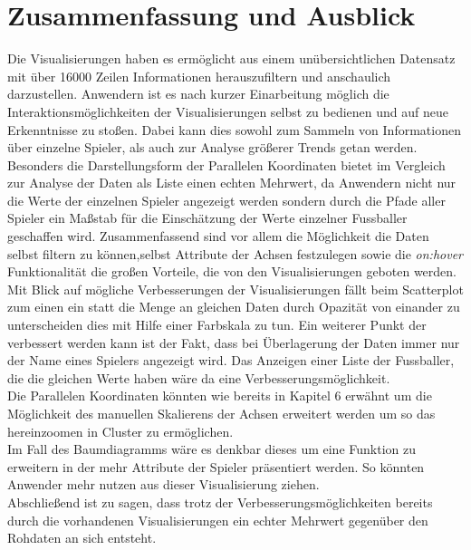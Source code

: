 \documentclass[usegeometry=true]{scrartcl}
\begin{document}
\section{Zusammenfassung und Ausblick}
Die Visualisierungen haben es ermöglicht aus einem unübersichtlichen Datensatz mit über 16000 Zeilen Informationen herauszufiltern und anschaulich darzustellen.
Anwendern ist es nach kurzer Einarbeitung möglich die Interaktionsmöglichkeiten der Visualisierungen selbst zu bedienen und auf neue Erkenntnisse zu stoßen. Dabei kann dies sowohl zum Sammeln von Informationen über einzelne Spieler, als auch zur Analyse größerer Trends getan werden. Besonders die Darstellungsform der Parallelen Koordinaten bietet im Vergleich zur Analyse der Daten als Liste einen echten Mehrwert, da Anwendern nicht nur die Werte der einzelnen Spieler angezeigt werden sondern durch die Pfade aller Spieler ein Maßstab für die Einschätzung der Werte einzelner Fussballer geschaffen wird. Zusammenfassend sind vor allem die Möglichkeit die Daten selbst filtern zu können,selbst Attribute der Achsen festzulegen sowie die \textit{on:hover} Funktionalität die großen Vorteile, die von den Visualisierungen geboten werden.\\
Mit Blick auf mögliche Verbesserungen der Visualisierungen fällt beim Scatterplot zum einen ein statt die Menge an gleichen Daten durch Opazität von einander zu unterscheiden dies mit Hilfe einer Farbskala zu tun. Ein weiterer Punkt der verbessert werden kann ist der Fakt, dass bei Überlagerung der Daten immer nur der Name eines Spielers angezeigt wird. Das Anzeigen einer Liste der Fussballer, die die gleichen Werte haben wäre da eine Verbesserungsmöglichkeit.\\
Die Parallelen Koordinaten könnten wie bereits in Kapitel 6 erwähnt um die Möglichkeit des manuellen Skalierens der Achsen erweitert werden um so das hereinzoomen in Cluster zu ermöglichen.\\
Im Fall des Baumdiagramms wäre es denkbar dieses um eine Funktion zu erweitern in der mehr Attribute der Spieler präsentiert werden. So könnten Anwender mehr nutzen aus dieser Visualisierung ziehen.\\ 
Abschließend ist zu sagen, dass trotz der Verbesserungsmöglichkeiten bereits durch die vorhandenen Visualisierungen ein echter Mehrwert gegenüber den Rohdaten an sich entsteht.
\end{document}
